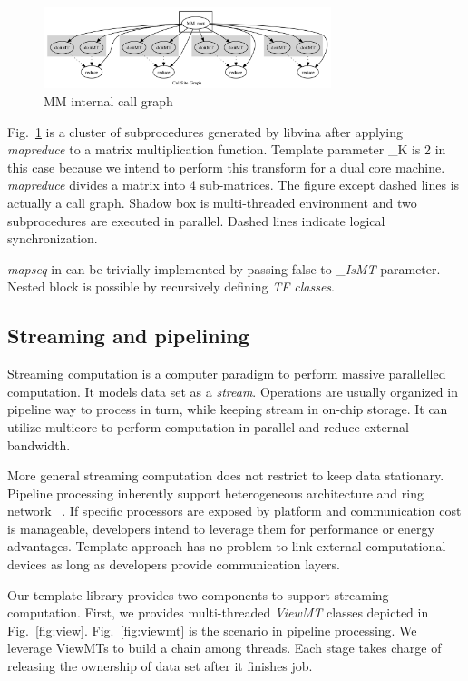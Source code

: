\documentclass[10pt, conference, compsocconf]{IEEEtran}
\begin{document}
\begin{figure}
\centering
\includegraphics[width=3.3in]{test_matrix}
\caption{MM internal call graph}\label{fig:mm}
\end{figure}

Fig.~\ref{fig:mm} is a cluster of subprocedures generated by libvina
after applying \emph{mapreduce} to a matrix multiplication
function. Template parameter \_K is 2 in this case because we intend
to perform this transform for a dual core machine. \emph{mapreduce}
divides a matrix into 4 sub-matrices. The figure except dashed lines
is actually a call graph. Shadow box is multi-threaded environment and two subprocedures are executed in parallel. Dashed lines indicate logical synchronization. 

\emph{mapseq} in \cite{b1} can be trivially implemented by passing false to \emph{\_IsMT} parameter. Nested block is possible by recursively defining \emph{TF classes}.

\subsection{Streaming and pipelining}
Streaming computation is a computer paradigm to perform massive parallelled computation. It models data set as a \emph{stream}. Operations are usually organized in pipeline way to process in turn, while keeping stream in on-chip storage. It can utilize multicore to perform computation in parallel and reduce external bandwidth. 

More general streaming computation does not restrict to keep data
stationary. Pipeline processing inherently support heterogeneous
architecture and ring network ~\cite{b19,b14}. If specific processors
are exposed by platform and communication cost is manageable, developers
intend to leverage  them for performance or energy
advantages. Template approach has no problem to link external
computational devices as long as developers provide communication layers.

Our template library provides two components to support streaming
computation. First, we provides multi-threaded \emph{ViewMT}
classes depicted in Fig.~\ref{fig:view}. Fig.~\ref{fig:viewmt}  is the
scenario in pipeline processing. We leverage ViewMTs to build a chain
among threads. Each stage takes charge of releasing the ownership of
data set after it finishes job.
\end{document}
